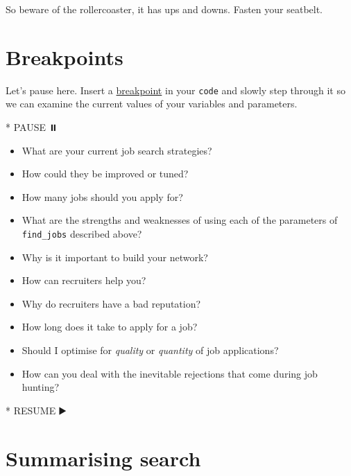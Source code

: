 \documentclass[
]{book}
\newenvironment{Shaded}{\begin{snugshade}}{\end{snugshade}}
\newcommand{\NormalTok}[1]{#1}
\newcommand{\SpecialStringTok}[1]{\textcolor[rgb]{0.31,0.60,0.02}{#1}}
\providecommand{\tightlist}{%
  \setlength{\itemsep}{0pt}\setlength{\parskip}{0pt}}
\begin{document}
So beware of the rollercoaster, it has ups and downs. Fasten your seatbelt. 🎢

\hypertarget{bp8}{%
\section{Breakpoints}\label{bp8}}

Let's pause here. Insert a \href{https://en.wikipedia.org/wiki/Breakpoint}{breakpoint} in your \texttt{code} and slowly step through it so we can examine the current values of your variables and parameters.

\begin{Shaded}
\begin{Highlighting}[]
\SpecialStringTok{* }\NormalTok{PAUSE ⏸️}
\end{Highlighting}
\end{Shaded}

\begin{itemize}
\tightlist
\item
  What are your current job search strategies?
\item
  How could they be improved or tuned?
\item
  How many jobs should you apply for?\\
\item
  What are the strengths and weaknesses of using each of the parameters of \texttt{find\_jobs} described above?
\item
  Why is it important to build your network?
\item
  How can recruiters help you?
\item
  Why do recruiters have a bad reputation?
\item
  How long does it take to apply for a job?
\item
  Should I optimise for \emph{quality} or \emph{quantity} of job applications?
\item
  How can you deal with the inevitable rejections that come during job hunting?
\end{itemize}

\begin{Shaded}
\begin{Highlighting}[]
\SpecialStringTok{* }\NormalTok{RESUME ▶️}
\end{Highlighting}
\end{Shaded}

\hypertarget{tldr8}{%
\section{Summarising search}\label{tldr8}}
\end{document}
